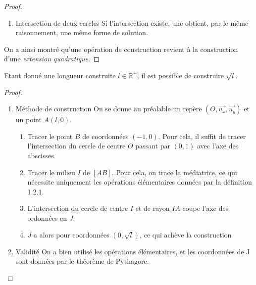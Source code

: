 \documentclass[a4paper,12pt,french,draft]{report}
\begin{document}
\begin{proof}
\begin{enumerate}
\[\begin{array}{lllll}
								a = \frac{y_A-y_B}{x_A-x_B}\\
								b = x_A\left(y_B - y_A + \frac{y_B-y_A}{x_A-x_B}\right)+y_A \\
								r = \sqrt{(x_M - x_\Omega)^2 + (y_M - y_\Omega)^2} \\
								y = ax + b \\
								(a^2 + 1)x^2 + 2(a(b-y_B)-x_\Omega)x + {x_\Omega}^2 + (b-y_\Omega)^2 - r^2 = 0
							\end{array}
							\right.
							\]
						Ce qui achève la preuve. D'autre part, s'il existe une solution, elle sera bien, pour chaque coordonnée de l'intersection, de la forme \(k + l \sqrt{\delta_0}\), avec \(k, l, \delta_0 \in \mathbb{K}\).
						\item{Intersection de deux cercles} Si l'intersection existe, une obtient, par le même raisonnement, une même forme de solution.
					\end{enumerate}
					On a ainsi montré qu'une opération de construction revient à la construction d'une \emph{extension quadratique}.
				\end{proof}
		
		\begin{proposition}
			Etant donné une longueur construite \(l \in \mathbb{R}^+\), il est possible de construire \(\sqrt{l}\).{}
		\end{proposition}
			\begin{proof}
				\begin{enumerate}
					\item{Méthode de construction}
					On se donne au préalable un repère \( (O, \vec{u_x}, \vec{u_y}) \) et un point \(A(l, 0)\). 
						\begin{enumerate}
							\item Tracer le point \(B\) de coordonnées \((-1, 0)\). Pour cela, il suffit de tracer l'intersection du cercle de centre \(O\) passant par \((0, 1)\) avec l'axe des abscisses.
							\item Tracer le milieu \(I\) de \([AB]\). Pour cela, on trace la médiatrice, ce qui nécessite uniquement les opérations élémentaires données par la définition 1.2.1.
							\item L'intersection du cercle de centre \(I\) et de rayon \(IA\) coupe l'axe des ordonnées en \(J\).
							\item \( J \) a alors pour coordonnées \((0, \sqrt{l})\), ce qui achève la construction
						\end{enumerate}
					\item{Validité} On a bien utilisé les opérations élémentaires, et les coordonnées de J sont données par le théorème de Pythagore.
				\end{enumerate}
			\end{proof}
			
\end{document}
